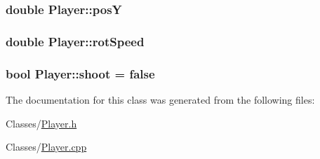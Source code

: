 \hypertarget{classPlayer_a683e60e3b76893cc5f1c0d54396cc201}{
\subsubsection[{pos\-Y}]{\setlength{\rightskip}{0pt plus 5cm}double Player\-::pos\-Y}}\label{classPlayer_a683e60e3b76893cc5f1c0d54396cc201}
\hypertarget{classPlayer_aa380cf130324054d55184b777dc4cdfa}{
\subsubsection[{rot\-Speed}]{\setlength{\rightskip}{0pt plus 5cm}double Player\-::rot\-Speed}}\label{classPlayer_aa380cf130324054d55184b777dc4cdfa}
\hypertarget{classPlayer_a598f2ce22ba8f9b61bd3f38a61183bc6}{
\subsubsection[{shoot}]{\setlength{\rightskip}{0pt plus 5cm}bool Player\-::shoot = false}}\label{classPlayer_a598f2ce22ba8f9b61bd3f38a61183bc6}


The documentation for this class was generated from the following files\-:\begin{DoxyCompactItemize}
\item 
Classes/\hyperlink{Player_8h}{Player.\-h}\item 
Classes/\hyperlink{Player_8cpp}{Player.\-cpp}\end{DoxyCompactItemize}
